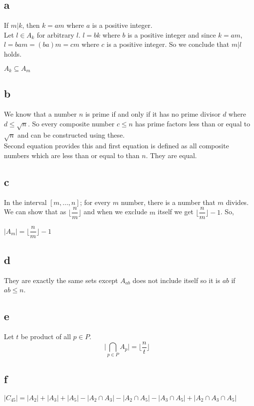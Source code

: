 \documentclass[12pt]{article}
\begin{document}
\subsection*{a}
If $m | k$, then $k=am$ where $a$ is a positive integer.\\
Let $l\in A_k$ for arbitrary $l$. $l = bk$ where $b$ is a positive integer and since $k=am$, $l=bam=(ba)m=cm$ where $c$ is a positive integer. So we conclude that $m|l$ holds.
\begin{center}
    $A_k \subseteq A_m$
\end{center}
\subsection*{b}
We know that a number $n$ is prime if and only if it has no prime divisor $d$ where $d\leq\sqrt{n}$. So every composite number $c\leq n$ has prime factors less than or equal to $\sqrt{n}$ and can be constructed using these.\\
Second equation provides this and first equation is defined as all composite numbers which are less than or equal to than $n$. They are equal.
\subsection*{c}
In the interval $[m, ..., n]$; for every $m$ number, there is a number that $m$ divides. We can show that as $\bigg\lfloor \dfrac{n}{m} \bigg\rfloor$ and when we exclude $m$ itself we get $\bigg\lfloor \dfrac{n}{m} \bigg\rfloor -1$. So,
\begin{center}
    $|A_m| = \bigg\lfloor \dfrac{n}{m} \bigg\rfloor -1$
\end{center}
\subsection*{d}
They are exactly the same sets except $A_{ab}$ does not include itself so it is $ab$ if $ab\leq n$.
\subsection*{e}
Let $t$ be product of all $p\in P$.
\begin{displaymath}
    \bigg| \bigcap\limits_{p \in P} A_p \bigg| = \bigg\lfloor \dfrac{n}{t} \bigg\rfloor
\end{displaymath}
\subsection*{f}
\begin{center}
    $|C_{45}| = |A_2| + |A_3| + |A_5| - |A_2\cap A_3| - |A_2\cap A_5| - |A_3\cap A_5| + |A_2\cap A_3\cap A_5|$
\end{center}
\end{document}
